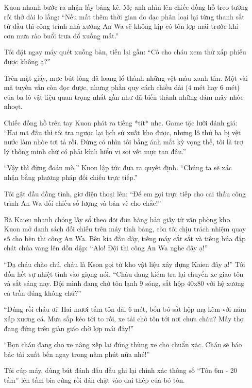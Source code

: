 ﻿\documentclass[../main.tex]{subfiles}
\begin{document}
Kuon nhanh bước ra nhận lấy bảng kê. Mẹ anh nhìn lên chiếc đồng hồ treo tường rồi thở dài lo lắng: ``Nếu mất thêm thời gian đo đạc phân loại lại từng thanh sắt từ đầu thì công trình nhà xưởng An Wa sẽ không kịp có tôn lợp mái trước khi cơn mưa rào buổi trưa đổ xuống mất.''

Tôi đặt ngay máy quét xuống bàn, tiến lại gần: ``Cô cho cháu xem thử xấp phiếu được không ạ?''

Trên mặt giấy, mực bút lông đã loang lổ thành những vệt màu xanh tím. Một vài mã tuyến vẫn còn đọc được, nhưng phần quy cách chiều dài (4 mét hay 6 mét) của ba lô vật liệu quan trọng nhất gần như đã biến thành những đám mây nhòe nhoẹt.

Chiếc đồng hồ trên tay Kuon phát ra tiếng *tít* nhẹ. Game tặc lưỡi đánh giá: ``Hai mã đầu thì tôi tra ngược lại lịch sử xuất kho được, nhưng lô thứ ba bị vệt nước làm nhòe tơi tả rồi. Đừng có nhìn tôi bằng ánh mắt kỳ vọng thế, tôi là trợ lý thông minh chứ có phải kính hiển vi soi vết mực tan đâu.''

``Vậy thì đừng đoán mò,'' Kuon lập tức đưa ra quyết định. ``Chúng ta sẽ xác nhận bằng phương pháp đối chiếu trực tiếp.''

Tôi gật đầu đồng tình, giơ điện thoại lên: ``Để em gọi trực tiếp cho cai thầu công trình An Wa đối chiếu số lượng và bản vẽ cho chắc!''

\ct

Bà Kaien nhanh chóng lấy sổ theo dõi đơn hàng bản giấy từ văn phòng kho. Kuon mở danh sách đối chiếu trên máy tính bảng, còn tôi chịu trách nhiệm quay số cho bên thi công An Wa. Bên kia đầu dây, tiếng máy cắt sắt và tiếng búa đập chát chúa vang lên dồn dập: ``Alo! Đội thi công An Wa nghe đây ạ!''

``Dạ cháu chào chú, cháu là Kson gọi từ kho vật liệu xây dựng Kaien đây ạ!'' Tôi dồn hết sự nhiệt tình vào giọng nói. ``Cháu đang kiểm tra lại chuyến xe giao tôn và sắt sáng nay. Đội mình đang chờ tôn lạnh 9 sóng, sắt hộp 40x80 với hệ xương cá trần đúng không chú?''

``Đúng rồi cháu ơi! Hai mươi tấm tôn dài 6 mét, bốn bó sắt hộp mạ kẽm với năm xấp xương cá. Mưa sắp kéo tới to rồi, xe tải chở tôn tới nơi chưa cháu? Mấy thợ đang đứng trên giàn giáo chờ lợp mái đây!''

``Bọn cháu đang cho xe nâng xếp lại đúng thùng xe cho chuẩn xác. Cháu sẽ báo bác tài xuất bến ngay trong năm phút nữa nhé!''

Tôi cúp máy, dùng bút đánh dấu dầu ghi lại chính xác thông số ``Tôn 6m - 20 tấm'' lên tấm bìa cứng rồi dán chặt vào đai thép của bó tôn.
\end{document}
